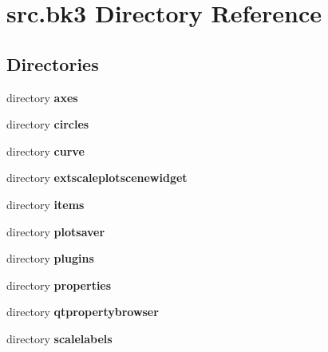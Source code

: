 \section{src.\+bk3 Directory Reference}
\label{dir_1aeec673d8c474797bcc2d6c4d84d1ec}
\subsection*{Directories}
\begin{DoxyCompactItemize}
\item 
directory {\bf axes}
\item 
directory {\bf circles}
\item 
directory {\bf curve}
\item 
directory {\bf extscaleplotscenewidget}
\item 
directory {\bf items}
\item 
directory {\bf plotsaver}
\item 
directory {\bf plugins}
\item 
directory {\bf properties}
\item 
directory {\bf qtpropertybrowser}
\item 
directory {\bf scalelabels}
\end{DoxyCompactItemize}
